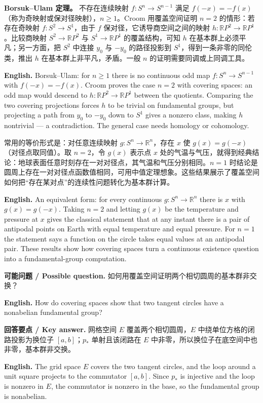 \documentclass[UTF8,11pt,a4paper]{ctexart}
\newcommand{\EN}[1]{\par\noindent\textbf{English.} #1\par}
\newcommand{\ASK}[4]{\par\noindent\textbf{可能问题 / Possible question.} #1\par\EN{#2}\noindent\textbf{回答要点 / Key answer.} #3\par\EN{#4}\medskip}
\begin{document}
\noindent\textbf{Borsuk--Ulam 定理。} 不存在连续映射 $f:S^n\to S^{n-1}$ 满足 $f(-x)=-f(x)$（称为奇映射或保对径映射），$n\ge1$。Croom 用覆盖空间证明 $n=2$ 的情形：若存在奇映射 $f:S^2\to S^1$，由于 $f$ 保对径，它诱导商空间之间的映射 $h:\mathbb R P^2\to\mathbb R P^1$。比较商映射 $S^2\to\mathbb R P^2$ 与 $S^1\to\mathbb R P^1$ 的覆盖结构，可知 $h$ 在基本群上必须平凡；另一方面，把 $S^2$ 中连接 $y_0$ 与 $-y_0$ 的路径投影到 $S^1$，得到一条非零的同伦类，推出 $h$ 在基本群上非平凡，矛盾。一般 $n$ 的证明需要同调或上同调工具。
\EN{Borsuk--Ulam: for $n\ge1$ there is no continuous odd map $f:S^n\to S^{n-1}$ with $f(-x)=-f(x)$. Croom proves the case $n=2$ with covering spaces: an odd map would descend to $h:\mathbb R P^2\to\mathbb R P^1$ between the quotients. Comparing the two covering projections forces $h$ to be trivial on fundamental groups, but projecting a path from $y_0$ to $-y_0$ down to $S^1$ gives a nonzero class, making $h$ nontrivial — a contradiction. The general case needs homology or cohomology.}

\noindent 常用的等价形式是：对任意连续映射 $g:S^n\to\mathbb R^n$，存在 $x$ 使 $g(x)=g(-x)$（对径点取同值）。取 $n=2$，令 $g(x)$ 表示点 $x$ 处的气温与气压，就得到经典结论：地球表面任意时刻存在一对对径点，其气温和气压分别相同。$n=1$ 时结论是圆周上存在一对对径点函数值相同，可用中值定理想象。这些结果展示了覆盖空间如何把“存在某对点”的连续性问题转化为基本群计算。
\EN{An equivalent form: for every continuous $g:S^n\to\mathbb R^n$ there is $x$ with $g(x)=g(-x)$. Taking $n=2$ and letting $g(x)$ be the temperature and pressure at $x$ gives the classical statement that at any instant there is a pair of antipodal points on Earth with equal temperature and equal pressure. For $n=1$ the statement says a function on the circle takes equal values at an antipodal pair. These results show how covering spaces turn a continuous existence question into a fundamental-group computation.}

\ASK{如何用覆盖空间证明两个相切圆周的基本群非交换？}{How do covering spaces show that two tangent circles have a nonabelian fundamental group?}{网格空间 $E$ 覆盖两个相切圆周，$E$ 中绕单位方格的闭路投影为换位子 $[a,b]$；$p_*$ 单射且该闭路在 $E$ 中非零，所以换位子在底空间中也非零，基本群非交换。}{The grid space $E$ covers the two tangent circles, and the loop around a unit square projects to the commutator $[a,b]$. Since $p_*$ is injective and the loop is nonzero in $E$, the commutator is nonzero in the base, so the fundamental group is nonabelian.}
\end{document}
